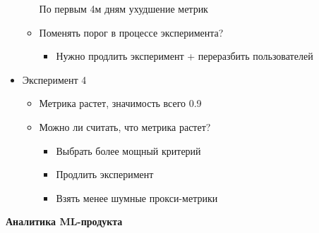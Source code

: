 \documentclass[a4paper, 12pt]{article}
\begin{document}
\begin{itemize}
\begin{itemize}
    По первым 4м дням ухудшение метрик
    
  \item
    
    Поменять порог в процессе эксперимента?
    

    \begin{itemize}
    \item
      
      Нужно продлить эксперимент + переразбить пользователей
      
    \end{itemize}
  \end{itemize}
\item
  
  Эксперимент 4
  

  \begin{itemize}
  \item
    
    Метрика растет, значимость всего 0.9
    
  \item
    
    Можно ли считать, что метрика растет?
    

    \begin{itemize}
    \item
      
      Выбрать более мощный критерий
      
    \item
      
      Продлить эксперимент
      
    \item
      
      Взять менее шумные прокси-метрики
      
    \end{itemize}
  \end{itemize}
\end{itemize}

\textbf{Аналитика ML-продукта}
\end{document}
